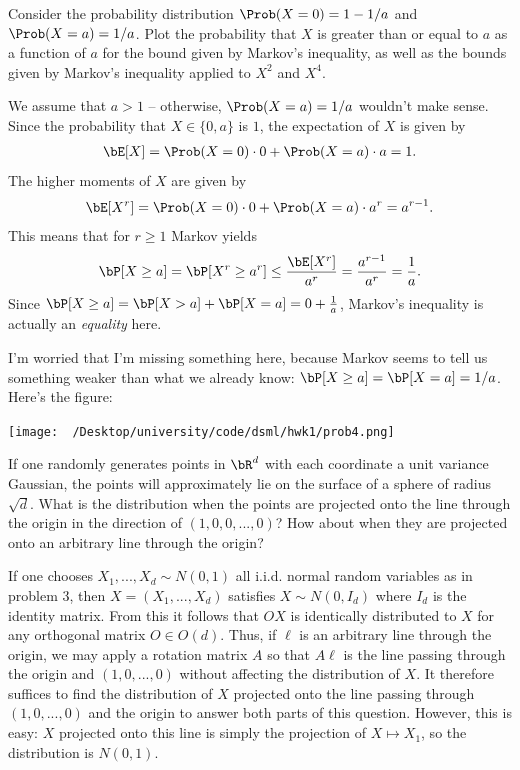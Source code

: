 \begin{homework}[e]
  \prob Consider the probability distribution $\Prob(X = 0) = 1 - 1/a$ and $\Prob(X = a) = 1/a$. Plot the probability that $X$ is greater than or equal to $a$ as a function of $a$ for the bound given by Markov's inequality, as well as the bounds given by Markov's inequality applied to $X^2$ and $X^4$.
  \begin{prf}
    We assume that $a > 1$ -- otherwise, $\Prob(X = a) = 1/a$ wouldn't make sense. Since the probability that $X \in \{0,a\}$ is $1$, the expectation of $X$ is given by
    \begin{align*}
      \bE[X] = \Prob(X=0)\cdot 0 + \Prob(X = a)\cdot a = 1.
    \end{align*}
    The higher moments of $X$ are given by
    \begin{align*}
      \bE[X^r] = \Prob(X=0)\cdot 0 + \Prob(X = a)\cdot a^r = a^{r-1}.
    \end{align*}
    This means that for $r \geq 1$ Markov yields
    \begin{align*}
      \bP[X\geq a] = \bP[X^r \geq a^r] \leq \frac{\bE[X^r]}{a^r} = \frac{a^{r-1}}{a^r} = \frac{1}{a}.
    \end{align*}
    Since $\bP[X\geq a] = \bP[X > a] + \bP[X = a] = 0 + \frac{1}{a}$, Markov's inequality is actually an \emph{equality} here.

    I'm worried that I'm missing something here, because Markov seems to tell us something weaker than what we already know: $\bP[X\geq a] = \bP[X = a] = 1/a$. Here's the figure:
    \begin{center}
      \texttt{[image: ~/Desktop/university/code/dsml/hwk1/prob4.png]}
      \label{fig:prob4-1}
    \end{center}
  \end{prf}

  \prob If one randomly generates points in $\bR^d$ with each coordinate a unit variance Gaussian, the points will approximately lie on the surface of a sphere of radius $\sqrt{d}$. What is the distribution when the points are projected onto the line through the origin in the direction of $(1,0,0,...,0)$? How about when they are projected onto an arbitrary line through the origin?
  \begin{prf}
    If one chooses $X_1,...,X_d \sim N(0,1)$ all i.i.d. normal random variables as in problem 3, then $X = (X_1,...,X_d)$ satisfies $X \sim N(0,I_d)$ where $I_d$ is the identity matrix. From this it follows that $OX$ is identically distributed to $X$ for any orthogonal matrix $O \in O(d)$. Thus, if $\ell$ is an arbitrary line through the origin, we may apply a rotation matrix $A$ so that $A\ell$ is the line passing through the origin and $(1,0,...,0)$ without affecting the distribution of $X$. It therefore suffices to find the distribution of $X$ projected onto the line passing through $(1,0,...,0)$ and the origin to answer both parts of this question. However, this is easy:
    $X$ projected onto this line is simply the projection of $X\mapsto X_1$, so the distribution is $N(0,1)$.
  \end{prf}


\end{homework}
